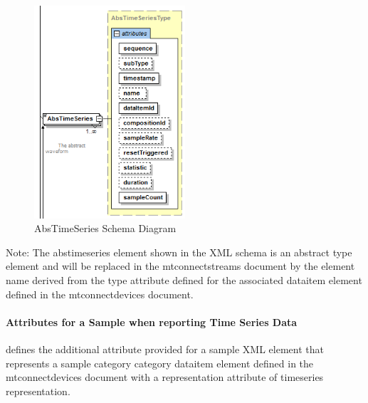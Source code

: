 \documentclass{mtconnect}	%
\begin{document}
\begin{figure}[ht]
  \centering
  \includegraphics[width=0.5\textwidth]{figures/abstimeseries-schema-diagram.png}
  \caption{AbsTimeSeries Schema Diagram}
  \label{fig:abstimeseries-schema-diagram}
\end{figure}
\FloatBarrier

\begin{note}
Note: The \gls{abstimeseries} element shown in the XML schema is an abstract type element and will be replaced in the \gls{mtconnectstreams} document by the \gls{element name} derived from the \gls{type} attribute defined for the associated \gls{dataitem} element defined in the \gls{mtconnectdevices} document.

\end{note}

\paragraph{Attributes for a Sample when reporting Time Series Data}\mbox{}

 defines the additional attribute provided for a \gls{sample} XML element that represents a \gls{sample category} category \gls{dataitem} element defined in the \gls{mtconnectdevices} document with a representation attribute of \gls{timeseries representation}. 
\end{document}
